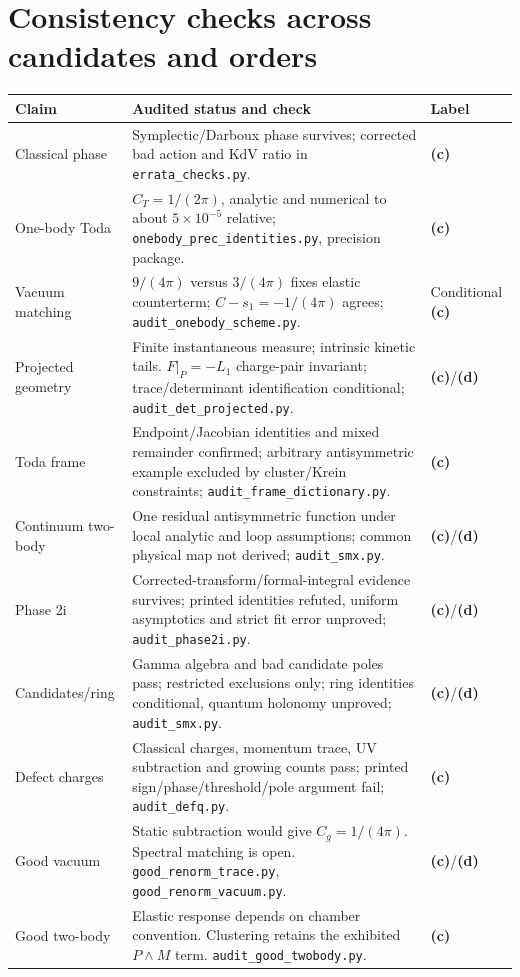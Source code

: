 \documentclass[11pt,a4paper]{article}
\newcommand{\Lc}{\textsf{\textbf{(c)}}\xspace}
\newcommand{\Ld}{\textsf{\textbf{(d)}}\xspace}
\newcommand{\file}[1]{\nolinkurl{#1}}
\theoremstyle{remark}\newtheorem{remark}[proposition]{Remark}
\begin{document}
\section{Consistency checks across candidates and orders}
\small
\begin{longtable}{@{}L{3cm}L{8.8cm}L{2.5cm}@{}}\toprule
Claim & Audited status and check & Label\\\midrule\endhead
Classical phase & Symplectic/Darboux phase survives; corrected bad action and
KdV ratio in \file{errata_checks.py}. & \Lc\\
One-body Toda & $C_T=1/(2\pi)$, analytic and numerical to about $5\times10^{-5}$
relative; \file{onebody_prec_identities.py}, precision package. & \Lc\\
Vacuum matching & $9/(4\pi)$ versus $3/(4\pi)$ fixes elastic counterterm;
$C-s_1=-1/(4\pi)$ agrees; \file{audit_onebody_scheme.py}. & Conditional \Lc\\
Projected geometry & Finite instantaneous measure; intrinsic kinetic tails.
$F|_P=-L_1$ charge-pair invariant; trace/determinant identification conditional;
\file{audit_det_projected.py}. & \Lc/\Ld\\
Toda frame & Endpoint/Jacobian identities and mixed remainder confirmed;
arbitrary antisymmetric example excluded by cluster/Krein constraints;
\file{audit_frame_dictionary.py}. & \Lc\\
Continuum two-body & One residual antisymmetric function under local analytic
and loop assumptions; common physical map not derived; \file{audit_smx.py}. & \Lc/\Ld\\
Phase 2i & Corrected-transform/formal-integral evidence survives; printed
identities refuted, uniform asymptotics and strict fit error unproved;
\file{audit_phase2i.py}. & \Lc/\Ld\\
Candidates/ring & Gamma algebra and bad candidate poles pass; restricted
exclusions only; ring identities conditional, quantum holonomy unproved;
\file{audit_smx.py}. & \Lc/\Ld\\
Defect charges & Classical charges, momentum trace, UV subtraction and growing
counts pass; printed sign/phase/threshold/pole argument fail;
\file{audit_defq.py}. & \Lc\\
Good vacuum & Static subtraction would give $C_g=1/(4\pi)$.
Spectral matching is open. \file{good_renorm_trace.py},
\file{good_renorm_vacuum.py}. & \Lc/\Ld\\
Good two-body & Elastic response depends on chamber convention. Clustering
retains the exhibited $P\wedge M$ term. \file{audit_good_twobody.py}. & \Lc\\

\end{longtable}
\end{document}
